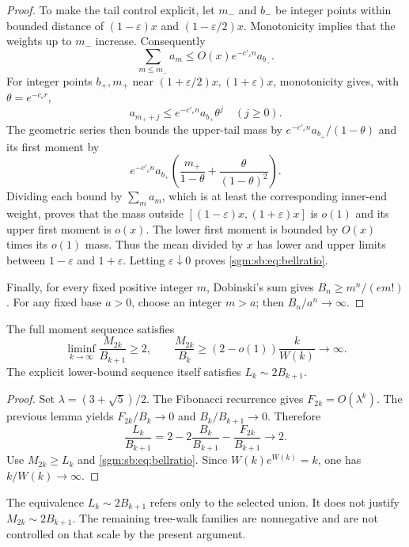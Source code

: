 \documentclass[11pt,letterpaper]{article}
\theoremstyle{remark}\newtheorem{remark}[theorem]{Remark}
\theoremstyle{definition}\newtheorem{definition}[theorem]{Definition}
\begin{document}
\begin{proof}
To make the tail control explicit, let $m_-$ and $b_-$ be integer points within bounded distance of $(1-\varepsilon)x$ and $(1-\varepsilon/2)x$. Monotonicity implies that the weights up to $m_-$ increase. Consequently
\[
 \sum_{m\le m_-}a_m\le O(x)e^{-c'_\varepsilon n}a_{b_-}.
\]
For integer points $b_+,m_+$ near $(1+\varepsilon/2)x,(1+\varepsilon)x$, monotonicity gives, with $\theta=e^{-c_\varepsilon r}$,
\[
 a_{m_++j}\le e^{-c'_\varepsilon n}a_{b_+}\theta^j\quad(j\ge0).
\]
The geometric series then bounds the upper-tail mass by
$e^{-c'_\varepsilon n}a_{b_+}/(1-\theta)$ and its first moment by
\[
 e^{-c'_\varepsilon n}a_{b_+}
 \left(\frac{m_+}{1-\theta}+\frac{\theta}{(1-\theta)^2}\right).
\]
Dividing each bound by $\sum_m a_m$, which is at least the corresponding inner-end weight, proves that the mass outside $[(1-\varepsilon)x,(1+\varepsilon)x]$ is $o(1)$ and its upper first moment is $o(x)$. The lower first moment is bounded by $O(x)$ times its $o(1)$ mass. Thus the mean divided by $x$ has lower and upper limits between $1-\varepsilon$ and $1+\varepsilon$. Letting $\varepsilon\downarrow0$ proves \eqref{sgm:sb:eq:bellratio}.

Finally, for every fixed positive integer $m$, Dobinski's sum gives $B_n\ge m^n/(e m!)$. For any fixed base $a>0$, choose an integer $m>a$; then $B_n/a^n\to\infty$.
\end{proof}

\begin{corollary}\label{sgm:sb:cor:ratio}
The full moment sequence satisfies
\begin{equation}\label{sgm:sb:eq:consequence}
 \liminf_{k\to\infty}\frac{M_{2k}}{B_{k+1}}\ge2,
 \qquad
 \frac{M_{2k}}{B_k}\ge(2-o(1))\frac{k}{W(k)}\longrightarrow\infty.
\end{equation}
The explicit lower-bound sequence itself satisfies $L_k\sim2B_{k+1}$.
\end{corollary}
\begin{proof}
Set $\lambda=(3+\sqrt5)/2$. The Fibonacci recurrence gives $F_{2k}=O(\lambda^k)$. The previous lemma yields $F_{2k}/B_k\to0$ and $B_k/B_{k+1}\to0$. Therefore
\[
 \frac{L_k}{B_{k+1}}=2-2\frac{B_k}{B_{k+1}}
                      -\frac{F_{2k}}{B_{k+1}}\longrightarrow2.
\]
Use $M_{2k}\ge L_k$ and \eqref{sgm:sb:eq:bellratio}. Since $W(k)e^{W(k)}=k$, one has $k/W(k)\to\infty$.
\end{proof}

The equivalence $L_k\sim2B_{k+1}$ refers only to the selected union. It does not justify $M_{2k}\sim2B_{k+1}$. The remaining tree-walk families are nonnegative and are not controlled on that scale by the present argument.
\end{document}
